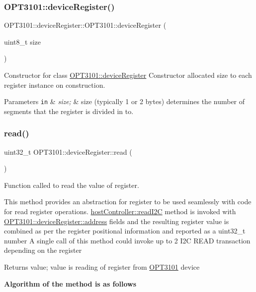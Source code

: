 \subsubsection{\texorpdfstring{O\+P\+T3101\+::device\+Register()}{OPT3101::deviceRegister()}}
{\footnotesize\ttfamily O\+P\+T3101\+::device\+Register\+::\+O\+P\+T3101\+::device\+Register (\begin{DoxyParamCaption}\item[{uint8\+\_\+t}]{size }\end{DoxyParamCaption})}



Constructor for class \mbox{\hyperlink{class_o_p_t3101_1_1device_register}{O\+P\+T3101\+::device\+Register}} Constructor allocated size to each register instance on construction. 


\begin{DoxyParams}[1]{Parameters}
\mbox{\tt in}  & {\em size;} & size (typically 1 or 2 bytes) determines the number of segments that the register is divided in to. \\
\hline
\end{DoxyParams}
\mbox{\label{class_o_p_t3101_1_1device_register_a7092e4906eaff27555bc589eaf737493}} 
\subsubsection{\texorpdfstring{read()}{read()}}
{\footnotesize\ttfamily uint32\+\_\+t O\+P\+T3101\+::device\+Register\+::read (\begin{DoxyParamCaption}{ }\end{DoxyParamCaption})}



Function called to read the value of register. 

This method provides an abstraction for register to be used seamlessly with code for read register operations. \mbox{\hyperlink{classhost_controller_a2bee6b3ec45fac241484f7dad943d8ed}{host\+Controller\+::read\+I2C}} method is invoked with \mbox{\hyperlink{class_o_p_t3101_1_1device_register_a81d25c717489ac388db0fed33c35bedd}{O\+P\+T3101\+::device\+Register\+::address}} fields and the resulting register value is combined as per the register positional information and reported as a uint32\+\_\+t number A single call of this method could invoke up to 2 I2C R\+E\+AD transaction depending on the register \begin{DoxyReturn}{Returns}
value; value is reading of register from \mbox{\hyperlink{namespace_o_p_t3101}{O\+P\+T3101}} device 
\end{DoxyReturn}
{\bfseries Algorithm of the method is as follows}


